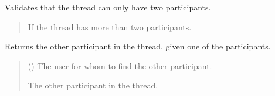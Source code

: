 \documentclass[letterpaper,10pt,english]{sphinxmanual}
\begin{document}
\begin{fulllineitems}
\begin{fulllineitems}
\label{\detokenize{modules/models:interactions.models.Thread.clean}}
\pysigstartsignatures
{}
\pysigstopsignatures
\sphinxAtStartPar
Validates that the thread can only have two participants.
\begin{quote}\begin{description}
\sphinxAtStartPar
{} \textendash{} If the thread has more than two participants.

\end{description}\end{quote}

\end{fulllineitems}


\begin{fulllineitems}
\label{\detokenize{modules/models:interactions.models.Thread.get_other_participant}}
\pysigstartsignatures
{}
\pysigstopsignatures
\sphinxAtStartPar
Returns the other participant in the thread, given one of the participants.
\begin{quote}\begin{description}
\sphinxAtStartPar
{} ({\hyperref[\detokenize{modules/models:account.models.CustomUser}]{}}) \textendash{} The user for whom to find the other participant.

\sphinxAtStartPar
The other participant in the thread.

\sphinxAtStartPar
{\hyperref[\detokenize{modules/models:account.models.CustomUser}]{}}

\end{description}\end{quote}

\end{fulllineitems}


\end{fulllineitems}
\end{document}
